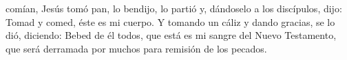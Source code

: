  comían, Jesús tomó pan, lo bendijo, lo partió y, dándoselo a los discípulos, dijo: Tomad y comed, éste es mi cuerpo. Y tomando un cáliz y dando gracias,
se lo dió, diciendo: Bebed de él todos, que está es mi sangre del Nuevo Testamento, que será derramada por muchos para remisión de los pecados.

